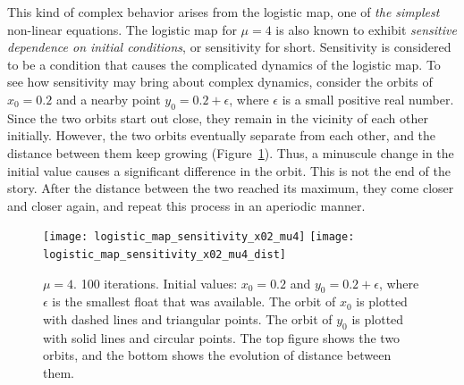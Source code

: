 \documentclass[10pt,twoside,draft]{book}
\begin{document}
This kind of complex behavior arises from the logistic map, one of \textit{the simplest} non-linear equations.
The logistic map for $\mu = 4$ is also known to exhibit \textit{sensitive dependence on initial conditions}, or sensitivity for short.
Sensitivity is considered to be a condition that causes the complicated dynamics of the logistic map.
To see how sensitivity may bring about complex dynamics, consider the orbits of $x_0 = 0.2$ and a nearby point $y_0 = 0.2 + \epsilon$, where $\epsilon$ is a small positive real number.
Since the two orbits start out close, they remain in the vicinity of each other initially.
However, the two orbits eventually separate from each other, and the distance between them keep growing (Figure~\ref{fig:logistic_sensitivity}).
Thus, a minuscule change in the initial value causes a significant difference in the orbit.
This is not the end of the story.
After the distance between the two reached its maximum, they come closer and closer again, and repeat this process in an aperiodic manner.
\begin{figure}[p]
  \centering
  \texttt{[image: logistic\_map\_sensitivity\_x02\_mu4]}
  \texttt{[image: logistic\_map\_sensitivity\_x02\_mu4\_dist]}
  \caption{
    $\mu = 4$. 100 iterations.
    Initial values: $x_0 = 0.2$ and $y_0 = 0.2 + \epsilon$, where $\epsilon$ is the smallest float that was available.
    The orbit of $x_0$ is plotted with dashed lines and triangular points.
    The orbit of $y_0$ is plotted with solid lines and circular points.
    The top figure shows the two orbits, and the bottom shows the evolution of distance between them.
  }
  \label{fig:logistic_sensitivity}
\end{figure}

\end{document}
